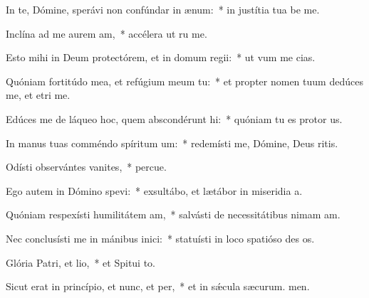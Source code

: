 \item In te, Dómine, sperávi non confúndar in ænum:~* in justítia tua be me.
\item Inclína ad me aurem am,~* accélera ut ru me.
\item Esto mihi in Deum protectórem, et in domum regii:~* ut vum me cias.
\item Quóniam fortitúdo mea, et refúgium meum  tu:~* et propter nomen tuum dedúces me, et etri me.
\item Edúces me de láqueo hoc, quem abscondérunt hi:~* quóniam tu es protor us.
\item In manus tuas comméndo spíritum um:~* redemísti me, Dómine, Deus ritis.
\item Odísti observántes vanites,~* percue.
\item Ego autem in Dómino spevi:~* exsultábo, et lætábor in miseridia a.
\item Quóniam respexísti humilitátem am,~* salvásti de necessitátibus nimam am.
\item Nec conclusísti me in mánibus inici:~* statuísti in loco spatióso des os.
\item Glória Patri, et lio,~* et Spitui to.
\item Sicut erat in princípio, et nunc, et per,~* et in sǽcula sæcurum. men.
